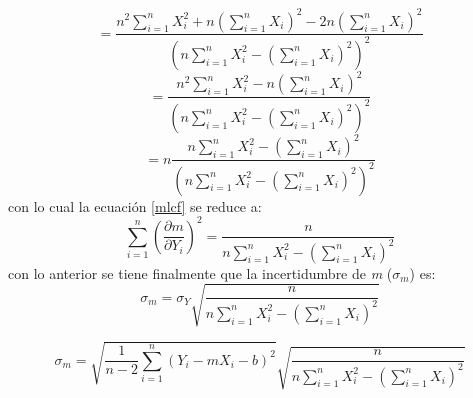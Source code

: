 \documentclass[12pt,letterpaper]{report}
\begin{document}
\begin{equation}
=  \dfrac{n^{2} \displaystyle\sum_{i=1}^{n} X_{i}^{2} + n \left(  \displaystyle\sum_{i=1}^{n} X_{i} \right)^{2} -2n \left(  \displaystyle\sum_{i=1}^{n} X_{i}\right)^{2}   }{\left( n \displaystyle\sum_{i=1}^{n} X_{i}^{2}- \left( \displaystyle\sum_{i=1}^{n} X_{i} \right) ^{2}\right) ^{2}}
\end{equation}
\begin{equation}
=  \dfrac{n^{2} \displaystyle\sum_{i=1}^{n} X_{i}^{2} - n \left(  \displaystyle\sum_{i=1}^{n} X_{i} \right)^{2}   }{\left( n \displaystyle\sum_{i=1}^{n} X_{i}^{2}- \left( \displaystyle\sum_{i=1}^{n} X_{i} \right) ^{2}\right) ^{2}}
\end{equation}
\begin{equation}\label{mlcf}
= n \dfrac{n \displaystyle\sum_{i=1}^{n} X_{i}^{2} -  \left(  \displaystyle\sum_{i=1}^{n} X_{i} \right)^{2}   }{\left( n \displaystyle\sum_{i=1}^{n} X_{i}^{2}- \left( \displaystyle\sum_{i=1}^{n} X_{i} \right) ^{2}\right) ^{2}}
\end{equation}
con lo cual la ecuación \ref{mlcf} se reduce a: 
\begin{equation}
\displaystyle\sum_{i=1}^{n} \left( \dfrac{\partial m}{\partial Y_{i}} \right) ^{2} =
\dfrac{n}{n \displaystyle\sum_{i=1}^{n} X_{i}^{2}- \left( \displaystyle\sum_{i=1}^{n} X_{i} \right) ^{2}}
\end{equation}
con lo anterior se tiene finalmente que la incertidumbre de \textit{m} ($ \sigma_{m} $) es:
\begin{equation}
\sigma_{m}= \sigma_{Y} \sqrt{\dfrac{n}{n \displaystyle\sum_{i=1}^{n} X_{i}^{2}- \left( \displaystyle\sum_{i=1}^{n} X_{i} \right) ^{2}}}
\end{equation}

\begin{equation}\label{sigmam}
\sigma_{m} =\sqrt{\dfrac{1}{n-2}\sum_{i=1}^{n}\left( Y_{i}-mX_{i}-b \right) ^{2}}   \sqrt{\dfrac{n}{n \displaystyle\sum_{i=1}^{n} X_{i}^{2}- \left( \displaystyle\sum_{i=1}^{n} X_{i} \right) ^{2}}}
\end{equation}
\end{document}
